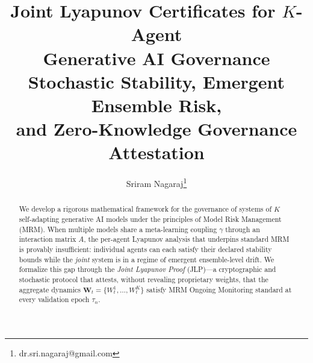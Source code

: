 \documentclass[12pt]{article}
\title{%
  \textbf{Joint Lyapunov Certificates for $K$-Agent\\
  Generative AI Governance}\\[0.5em]
  \large Stochastic Stability, Emergent Ensemble Risk,\\
  and Zero-Knowledge Governance Attestation
}
\author{%
  Sriram Nagaraj\footnote{dr.sri.nagaraj@gmail.com}
}
\date{}
\theoremstyle{plain}
\theoremstyle{definition}
\newcommand{\W}{\mathbf{W}}
\begin{document}
\maketitle
\thispagestyle{empty}

\begin{abstract}
  We develop a rigorous mathematical framework for the governance of systems of
  $K$ self-adapting generative AI models under the principles of
  Model Risk Management (MRM).  When multiple models share a
  meta-learning coupling $\gamma$ through an interaction matrix $A$, the
  per-agent Lyapunov analysis that underpins standard MRM is provably insufficient: individual agents can each satisfy their
  declared stability bounds while the \emph{joint} system is in a
  regime of emergent ensemble-level drift.  We formalize this gap through the
  \emph{Joint Lyapunov Proof} (JLP)---a cryptographic and stochastic
  protocol that attests, without revealing proprietary weights, that the
  aggregate dynamics $\W_t = \{W^1_t, \ldots, W^K_t\}$ satisfy MRM Ongoing Monitoring standard at every validation epoch $\tau_n$.


\end{abstract}
\end{document}

